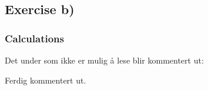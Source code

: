 \documentclass{article}
\begin{document}
\subsection{Exercise b)} \label{sec:Method b)}

  \subsubsection{Calculations}

    Det under som ikke er mulig å lese blir kommentert ut:

    \iffalse

    dovkdfv
    fvokdfv
    odkv
    dfvkd
    ofvkdfovkdf

    \fi

    Ferdig kommentert ut.

\iffalse
    \begin{equation*} \label{eq:fullmatrixeqbackward}
      \begin{bmatrix}
        d_1 & c_1 & 0 & 0 & \dots & 0 \\
        0 & \tilde{d}_2 & c_2 & 0 & \dots & 0 \\
        0 & 0 & \tilde{d}_3 & c_3 & \dots & 0 \\
        \vdots & \vdots & \vdots & \vdots & \ddots & \vdots \\
        0 & 0 & 0 & 0 & \tilde{d}_{n-1} & c_{n-1} \\
        0 & 0 & 0 & 0 & 0 & \tilde{d}_n \\
      \end{bmatrix}
      \begin{bmatrix}
        v_1 \\
        v_2 \\
        v_3 \\
        \vdots \\
        v_{n-1} \\
        v_n \\
      \end{bmatrix}
      =
      \begin{bmatrix}
        \tilde{b}_1 \\
        \tilde{b}_2 \\
        \tilde{b}_3 \\
        \vdots \\
        \tilde{b}_{n-1} \\
        \tilde{b}_n \\
      \end{bmatrix}
    \end{equation*} \\
\fi
\end{document}
